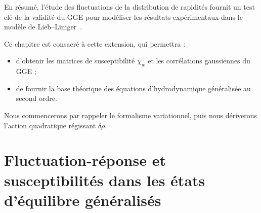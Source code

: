 \medskip
En résumé, l’étude des fluctuations de la distribution de rapidités fournit un test clé de la validité du GGE pour modéliser les résultats expérimentaux dans le modèle de Lieb–Liniger~\cite{DeNardis2017}.

\medskip
Ce chapitre est consacré à cette extension, qui permettra :
\begin{itemize}[label = $\bullet$]
  \item d’obtenir les matrices de susceptibilité \(\chi_{w}\)  et les corrélations gaussiennes du GGE ;
  \item de fournir la base théorique des équations d’hydrodynamique généralisée au second ordre.
\end{itemize}

Nous commencerons par rappeler le formalisme variationnel, puis nous dériverons l’action quadratique régissant \(\delta\rho\).  %

\medskip




\section{Fluctuation-réponse et susceptibilités dans les états d’équilibre généralisés}

%
%
%
%


